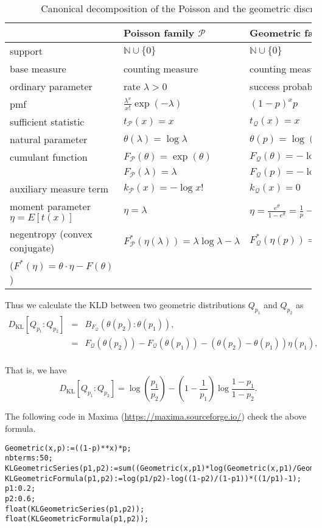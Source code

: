 \documentclass{article}
\def\bbN{\mathbb{N}}
\def\calP{\mathcal{P}}
\def\calQ{\mathcal{Q}}
\def\KL{\mathrm{KL}}
\begin{document}
\begin{table}
\centering
\begin{tabular}{lll}
 & Poisson family $\calP$ & Geometric family $\calQ$ \\ \hline
support & $\bbN \cup\{0\}$&   $\bbN \cup\{0\}$\\
base measure & counting measure  & counting measure\\
ordinary parameter & rate $\lambda>0$ & success probability $p\in (0,1)$ \\
pmf & $ \frac{\lambda^x}{x!} \exp(-\lambda)$  & $(1-p)^x p$\\
sufficient statistic & $t_\calP(x)=x$ & $t_\calQ(x)=x$\\
natural parameter & $\theta(\lambda)=\log\lambda$ & $\theta(p)=\log(1-p)$\\
cumulant function & $F_\calP(\theta)=\exp(\theta)$ & $F_\calQ(\theta)=-\log(1-\exp(\theta))$\\
                  & $F_\calP(\lambda)=\lambda$ & $F_\calQ(p)=-\log(p)$\\
auxiliary measure term & $k_\calP(x)=-\log x!$ & $k_\calQ(x)=0$\\
moment parameter $\eta=E[t(x)]$ & $\eta=\lambda$ & $\eta=\frac{e^\theta}{1-e^\theta}=\frac{1}{p}-1$\\
negentropy (convex conjugate) & $F^*_\calP(\eta(\lambda))=\lambda\log\lambda-\lambda$ & $F^*_\calQ(\eta(p))=\left(1-\frac{1}{p}\right)\log(1-p)+\log p$\\
($F^*(\eta)=\theta\cdot\eta-F(\theta)$)
\end{tabular}
\caption{Canonical decomposition of the Poisson and the geometric discrete exponential families.}\label{tab:comparison}
\end{table}

Thus we calculate the KLD between two geometric distributions $Q_{p_1}$ and $Q_{p_2}$ as
\begin{eqnarray*}
D_\KL[Q_{p_1}:Q_{p_2}]&=&B_{F_\calQ}(\theta(p_2):\theta(p_1)),\\
&=& F_\calQ(\theta(p_2))-F_\calQ(\theta(p_1))-(\theta(p_2)-\theta(p_1))\eta(p_1),\\
\end{eqnarray*}

That is, we have
$$
\boxed{D_\KL[Q_{p_1}:Q_{p_2}]=\log\left(\frac{p_1}{p_2}\right)-\left(1-\frac{1}{p_1}\right)\log \frac{1-p_1}{1-p_2}}.
$$

The following code in {\sc Maxima} (\url{https://maxima.sourceforge.io/}) check the above formula.
{\footnotesize
\begin{verbatim}
Geometric(x,p):=((1-p)**x)*p;
nbterms:50;
KLGeometricSeries(p1,p2):=sum((Geometric(x,p1)*log(Geometric(x,p1)/Geometric(x,p2))),x,0,nbterms);
KLGeometricFormula(p1,p2):=log(p1/p2)-log((1-p2)/(1-p1))*((1/p1)-1);
p1:0.2;
p2:0.6;
float(KLGeometricSeries(p1,p2));
float(KLGeometricFormula(p1,p2));
\end{verbatim}
}
\end{document}
